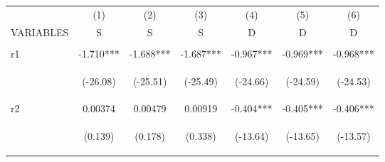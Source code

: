\documentclass[]{article}
\begin{document}
\begin{center}
\begin{tabular}{lcccccc} \hline
 & (1) & (2) & (3) & (4) & (5) & (6) \\
VARIABLES & S & S & S & D & D & D \\ \hline
\vspace{4pt} & \begin{footnotesize}\end{footnotesize} & \begin{footnotesize}\end{footnotesize} & \begin{footnotesize}\end{footnotesize} & \begin{footnotesize}\end{footnotesize} & \begin{footnotesize}\end{footnotesize} & \begin{footnotesize}\end{footnotesize} \\
r1 & -1.710*** & -1.688*** & -1.687*** & -0.967*** & -0.969*** & -0.968*** \\
\vspace{4pt} & \begin{footnotesize}(-26.08)\end{footnotesize} & \begin{footnotesize}(-25.51)\end{footnotesize} & \begin{footnotesize}(-25.49)\end{footnotesize} & \begin{footnotesize}(-24.66)\end{footnotesize} & \begin{footnotesize}(-24.59)\end{footnotesize} & \begin{footnotesize}(-24.53)\end{footnotesize} \\
r2 & 0.00374 & 0.00479 & 0.00919 & -0.404*** & -0.405*** & -0.406*** \\
\vspace{4pt} & \begin{footnotesize}(0.139)\end{footnotesize} & \begin{footnotesize}(0.178)\end{footnotesize} & \begin{footnotesize}(0.338)\end{footnotesize} & \begin{footnotesize}(-13.64)\end{footnotesize} & \begin{footnotesize}(-13.65)\end{footnotesize} & \begin{footnotesize}(-13.57)\end{footnotesize} \\

\end{tabular}
\end{center}
\end{document}

